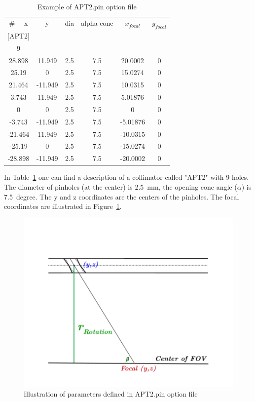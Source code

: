 \documentclass[12pt]{article}
\begin{document}
 \begin{table}[ht]
 \begin{center}
     \begin{tabular}{cccccc}
      \#~~ x & y & dia & alpha cone & $x_{focal}$ & $y_{focal}$ \\
	  {[APT2]} &  & &  &  &  \\
	   9 &  & &  &  &  \\
	   28.898 & 11.949 & 2.5 & 7.5 & 20.0002 & 0 \\
		25.19 & 0 & 2.5 & 7.5 & 15.0274 & 0 \\
		21.464 & -11.949 & 2.5 & 7.5 & 10.0315 & 0 \\
		3.743 & 11.949 & 2.5 & 7.5 & 5.01876 & 0 \\
		0     & 0 & 2.5 & 7.5 & 0 & 0 \\
		-3.743 & -11.949 & 2.5 & 7.5 & -5.01876 & 0 \\
		-21.464 & 11.949 & 2.5 & 7.5 & -10.0315 & 0 \\
		-25.19 & 0 & 2.5 & 7.5 & -15.0274 & 0 \\
		-28.898 & -11.949 & 2.5 & 7.5 & -20.0002 & 0 \\
     
     \end{tabular}
     \caption{Example of APT2.pin option file}
     \label{tab:ResTUBES}
  \end{center}
  \end{table}
In Table~\ref{tab:ResTUBES} one can find a description of a collimator called "APT2" with 9 holes. The diameter of pinholes (at the center) is 2.5~mm, the opening cone angle ($\alpha$) is 7.5~degree. The y and z coordinates are the centers of the pinholes. The focal coordinates are illustrated in Figure~\ref{fig:pinhole}.
\begin{figure}[htp]
\centering
\includegraphics[scale=0.7]{figs/pinhole.pdf}
\caption{Illustration of parameters defined in APT2.pin option file}
\label{fig:pinhole}
\end{figure}
\end{document}

